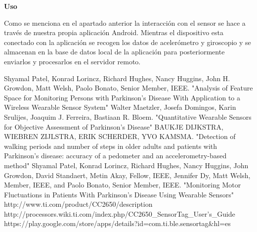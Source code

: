 \documentclass[11pt,spanish]{article}
\begin{document}
{\bf Uso}
\newline

Como se menciona en el apartado anterior la interacción con el sensor se hace a través de nuestra propia aplicación Android. Mientras el dispositivo esta conectado con la aplicación se recogen los datos de acelerómetro y giroscopio y se almacenan en la base de datos local de la aplicación para posteriormente enviarlos y procesarlos en el servidor remoto.

\newpage
\begin{thebibliography}{10}
    Shyamal Patel, Konrad Lorincz, Richard Hughes, Nancy Huggins, John H. Growdon, Matt Welsh, Paolo 		Bonato, Senior Member, IEEE. "Analysis of Feature Space for Monitoring Persons with Parkinson’s
	Disease With Application to a Wireless Wearable Sensor System"
    Walter Maetzler, Josefa Domingos, Karin Srulijes, Joaquim J. Ferreira, Bastiaan R. Bloem.       	     "Quantitative Wearable Sensors for Objective Assessment of Parkinson’s Disease"
    BAUKJE DIJKSTRA, WIEBREN ZIJLSTRA, ERIK SCHERDER, YVO KAMSMA. "Detection of walking periods and 	     number of steps in older adults and patients with Parkinson’s disease: accuracy of a pedometer and       an accelerometry-based method"
    Shyamal Patel, Konrad Lorincz, Richard Hughes, Nancy Huggins, John Growdon, David Standaert, Metin       Akay, Fellow, IEEE, Jennifer Dy, Matt Welsh, Member, IEEE, and Paolo Bonato, Senior Member, IEEE.       "Monitoring Motor Fluctuations in Patients With Parkinson’s Disease Using Wearable Sensors"
     http://www.ti.com/product/CC2650/description
     http://processors.wiki.ti.com/index.php/CC2650\_SensorTag\_User's\_Guide
     https://play.google.com/store/apps/details?id=com.ti.ble.sensortag\&hl=es
\end{thebibliography}
\end{document}
